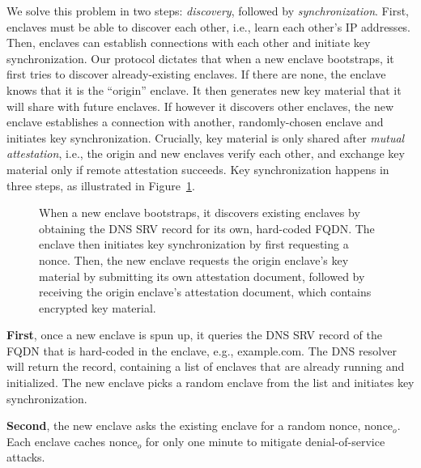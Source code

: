 We solve this problem in two steps: \emph{discovery}, followed by
\emph{synchronization}.  First, enclaves must be able to discover each other,
i.e., learn each other's IP addresses.  Then, enclaves can establish connections
with each other and initiate key synchronization.  Our protocol dictates that
when a new enclave bootstraps, it first tries to discover already-existing
enclaves.  If there are none, the enclave knows that it is the ``origin''
enclave.  It then generates new key material that it will share with future
enclaves.  If however it discovers other enclaves, the new enclave establishes a
connection with another, randomly-chosen enclave and initiates key
synchronization.  Crucially, key material is only shared after \emph{mutual
attestation}, i.e., the origin and new enclaves verify each other, and exchange
key material only if remote attestation succeeds.  Key synchronization happens
in three steps, as illustrated in Figure~\ref{fig:key-synchronization}.

\begin{figure}[t]
  \centering
  
  \caption{When a new enclave bootstraps, it discovers existing enclaves by
    obtaining the DNS SRV record for its own, hard-coded FQDN.  The enclave then
    initiates key synchronization by first requesting a nonce.  Then, the new
    enclave requests the origin enclave's key material by submitting its own
    attestation document, followed by receiving the origin enclave's attestation
    document, which contains encrypted key material.}
  \label{fig:key-synchronization}
\end{figure}

\textbf{First}, once a new enclave is spun up, it queries the DNS SRV record of
the FQDN that is hard-coded in the enclave, e.g., example.com.  The DNS resolver
will return the record, containing a list of enclaves that are already running
and initialized.  The new enclave picks a random enclave from the list and
initiates key synchronization.

\textbf{Second}, the new enclave asks the existing enclave for a random nonce,
$\textrm{nonce}_o$.  Each enclave caches $\textrm{nonce}_o$ for only one minute
to mitigate denial-of-service attacks.

